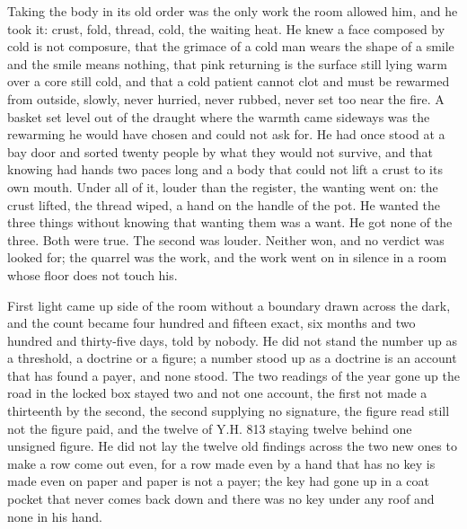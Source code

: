 Taking the body in its old order was the only work the room allowed him, and he took it: crust, fold, thread, cold, the waiting heat. He knew a face composed by cold is not composure, that the grimace of a cold man wears the shape of a smile and the smile means nothing, that pink returning is the surface still lying warm over a core still cold, and that a cold patient cannot clot and must be rewarmed from outside, slowly, never hurried, never rubbed, never set too near the fire. A basket set level out of the draught where the warmth came sideways was the rewarming he would have chosen and could not ask for. He had once stood at a bay door and sorted twenty people by what they would not survive, and that knowing had hands two paces long and a body that could not lift a crust to its own mouth. Under all of it, louder than the register, the wanting went on: the crust lifted, the thread wiped, a hand on the handle of the pot. He wanted the three things without knowing that wanting them was a want. He got none of the three. Both were true. The second was louder. Neither won, and no verdict was looked for; the quarrel was the work, and the work went on in silence in a room whose floor does not touch his.

First light came up  side of the room without a boundary drawn across the dark, and the count became four hundred and fifteen exact, six months and two hundred and thirty-five days, told by nobody. He did not stand the number up as a threshold, a doctrine or a figure; a number stood up as a doctrine is an account that has found a payer, and none stood. The two readings of the year gone up the road in the locked box stayed two and not one account, the first not made a thirteenth by the second, the second supplying no signature, the figure read still not the figure paid, and the twelve of Y.H. 813 staying twelve behind one unsigned figure. He did not lay the twelve old findings across the two new ones to make a row come out even, for a row made even by a hand that has no key is made even on paper and paper is not a payer; the key had gone up in a coat pocket that never comes back down and there was no key under any roof and none in his hand.

